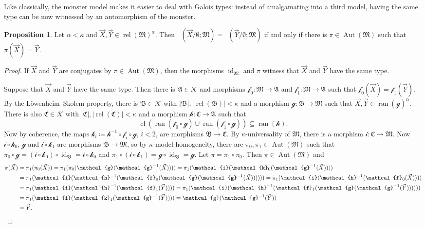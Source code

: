 \documentclass[a4paper]{amsart}
\theoremstyle{definition}
\newtheorem{proposition}[definition]{Proposition}
\theoremstyle{remark}
\newcommand{\A}{\mathcal{A}}
\newcommand{\B}{\mathcal{B}}
\newcommand{\C}{\mathcal{C}}
\newcommand{\M}{\mathcal{M}}
\DeclareMathOperator{\ran}{ran}
\DeclareMathOperator{\rel}{rel}
\newcommand{\K}{\mathcal{K}}
\theoremstyle{definition}
\renewcommand{\A}{\mathfrak{A}}
\renewcommand{\B}{\mathfrak{B}}
\renewcommand{\C}{\mathfrak{C}}
\renewcommand{\M}{\mathfrak{M}}
\DeclareMathOperator{\gtype}{tp_g}
\DeclareMathOperator{\id}{id}
\DeclareMathOperator{\Aut}{Aut}
\newcommand{\f}{\mathcal{f}}
\newcommand{\g}{\mathcal{g}}
\newcommand{\h}{\mathcal{h}}
\renewcommand{\k}{\mathcal{k}}
\DeclareMathOperator{\cl}{cl}
\begin{document}
Like classically, the monster model makes it easier to deal with Galois types: instead of amalgamating into a third model, having the same type can be now witnessed by an automorphism of the monster.

\begin{proposition}
    Let $\alpha<\kappa$ and $\vec X,\vec Y\in\rel(\M)^\alpha$. Then $\gtype(\vec X/\emptyset; \M) = \gtype(\vec Y/\emptyset; \M)$ if and only if there is $\pi\in\Aut(\M)$ such that $\pi(\vec X) = \vec Y$.
\end{proposition}
\begin{proof}
    \renewcommand{\i}{\mathcal{i}}
    If $\vec X$ and $\vec Y$ are conjugates by $\pi\in\Aut(\M)$, then the morphisms $\id_\M$ and $\pi$ witness that $\vec X$ and $\vec Y$ have the same type.
    
    Suppose that $\vec X$ and $\vec Y$ have the same type. Then there is $\A\in\K$ and morphisms $\f_0\colon\M\to\A$ and $\f_1\colon\M\to\A$ such that $\f_0(\vec X) = \f_1(\vec Y)$. By the Löwenheim--Skolem property, there is $\B\in\K$ with $|\B|,|\rel(\B)|<\kappa$ and a morphism $\g\colon\B\to\M$ such that $\vec X,\vec Y\in\ran(\g)^\alpha$. There is also $\C\in\K$ with $|\C|,|\rel(\C)|<\kappa$ and a morphism $\h\colon\C\to\A$ such that
    \[
        \cl(\ran(\f_0\circ\g)\cup\ran(\f_1\circ\g))\subseteq\ran(\h).
    \]
    Now by coherence, the maps $\k_i\coloneqq \h^{-1}\circ\f_i\circ\g$, $i<2$, are morphisms $\B\to\C$. By $\kappa$-universality of $\M$, there is a morphism $\i\colon\C\to\M$. Now $\i\circ\k_0$, $\g$ and $\i\circ\k_1$ are morphisms $\B\to\M$, so by $\kappa$-model-homogeneity, there are $\pi_0,\pi_1\in\Aut(\M)$ such that $\pi_0\circ\g = (\i\circ\k_0)\circ\id_\B = \i\circ\k_0$   and $\pi_1\circ(\i\circ\k_1) = \g\circ\id_\B = \g$. Let $\pi = \pi_1\circ\pi_0$. Then $\pi\in\Aut(\M)$ and
    \begin{align*}
        \pi(\vec X) &= \pi_1(\pi_0(\vec X)) = \pi_1(\pi_0(\g(\g^{-1}(\vec X)))) = \pi_1(\i(\k_0(\g^{-1}(\vec X)))) \\
        &= \pi_1(\i(\h^{-1}(\f_0(\g(\g^{-1}(\vec X)))))) = \pi_1(\i(\h^{-1}(\f_0(\vec X)))) \\
        &= \pi_1(\i(\h^{-1}(\f_1(\vec Y)))) = \pi_1(\i(\h^{-1}(\f_1(\g(\g^{-1}(\vec Y)))))) \\
        &= \pi_1(\i(\k_1(\g^{-1}(\vec Y)))) = \g(\g^{-1}(\vec Y)) \\
        &= \vec Y. \qedhere
    \end{align*}
\end{proof}
\end{document}
